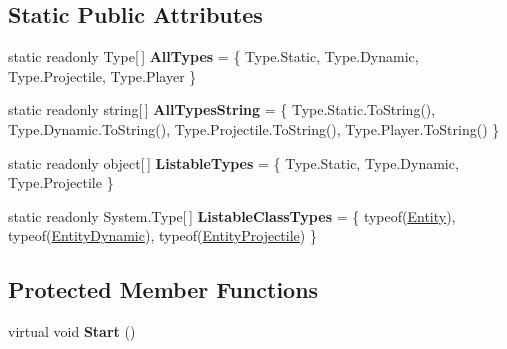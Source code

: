 \subsection*{Static Public Attributes}
\begin{DoxyCompactItemize}
\item 
\hypertarget{class_skyrates_1_1_common_1_1_entity_1_1_entity_aa2264aa396ec6c08519c50f6e872596e}{static readonly Type\mbox{[}$\,$\mbox{]} {\bfseries All\-Types} = \{ Type.\-Static, Type.\-Dynamic, Type.\-Projectile, Type.\-Player \}}\label{class_skyrates_1_1_common_1_1_entity_1_1_entity_aa2264aa396ec6c08519c50f6e872596e}

\item 
\hypertarget{class_skyrates_1_1_common_1_1_entity_1_1_entity_a824e2b260185ecccfa385b4a80eab46c}{static readonly string\mbox{[}$\,$\mbox{]} {\bfseries All\-Types\-String} = \{ Type.\-Static.\-To\-String(), Type.\-Dynamic.\-To\-String(), Type.\-Projectile.\-To\-String(), Type.\-Player.\-To\-String() \}}\label{class_skyrates_1_1_common_1_1_entity_1_1_entity_a824e2b260185ecccfa385b4a80eab46c}

\item 
\hypertarget{class_skyrates_1_1_common_1_1_entity_1_1_entity_adc830384f250e2d5f9b33229d91885ce}{static readonly object\mbox{[}$\,$\mbox{]} {\bfseries Listable\-Types} = \{ Type.\-Static, Type.\-Dynamic, Type.\-Projectile \}}\label{class_skyrates_1_1_common_1_1_entity_1_1_entity_adc830384f250e2d5f9b33229d91885ce}

\item 
\hypertarget{class_skyrates_1_1_common_1_1_entity_1_1_entity_a9abf8cce12c295b351195de009cfd007}{static readonly System.\-Type\mbox{[}$\,$\mbox{]} {\bfseries Listable\-Class\-Types} = \{ typeof(\hyperlink{class_skyrates_1_1_common_1_1_entity_1_1_entity}{Entity}), typeof(\hyperlink{class_skyrates_1_1_common_1_1_entity_1_1_entity_dynamic}{Entity\-Dynamic}), typeof(\hyperlink{class_entity_projectile}{Entity\-Projectile}) \}}\label{class_skyrates_1_1_common_1_1_entity_1_1_entity_a9abf8cce12c295b351195de009cfd007}

\end{DoxyCompactItemize}
\subsection*{Protected Member Functions}
\begin{DoxyCompactItemize}
\item 
\hypertarget{class_skyrates_1_1_common_1_1_entity_1_1_entity_acb5cc7450eefd4c794e9f72e0a422834}{virtual void {\bfseries Start} ()}\label{class_skyrates_1_1_common_1_1_entity_1_1_entity_acb5cc7450eefd4c794e9f72e0a422834}

\end{DoxyCompactItemize}
